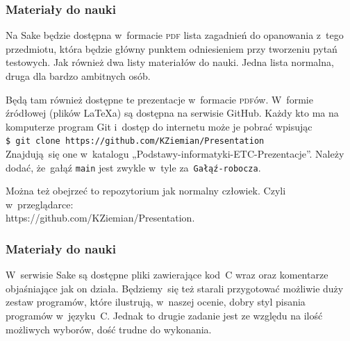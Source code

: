 \documentclass[10pt,t]{beamer}
\begin{document}
\begin{frame}
  \frametitle{Materiały do nauki}


  Na Sake będzie dostępna w~formacie \textsc{pdf} \alert{lista zagadnień do
    opanowania z~tego przedmiotu}, która będzie główny punktem odniesieniem
  przy tworzeniu pytań testowych. Jak również dwa listy materiałów do nauki.
  Jedna lista normalna, druga dla bardzo ambitnych osób.

  Będą tam również dostępne te prezentacje w~formacie \textsc{pdf}ów.
  W~formie źródłowej (plików \LaTeX a) są dostępna na serwisie GitHub.
  Każdy kto ma na komputerze program Git i~dostęp do internetu może je
  pobrać wpisując \\
  \texttt{\$ git clone https://github.com/KZiemian/Presentation} \\
  Znajdują~się one w~katalogu „Podstawy-informatyki-ETC-Prezentacje”.
  Należy dodać, że~gałąź \texttt{main} jest zwykle w~tyle
  za~\texttt{Gałąź-robocza}.

  Można też obejrzeć to repozytorium jak normalny człowiek. Czyli
  w~przeglądarce: \\
  {https://github.com/KZiemian/Presentation}.

\end{frame}





\begin{frame}
  \frametitle{Materiały do nauki}


  W~serwisie Sake są dostępne pliki zawierające kod~C wraz oraz komentarze
  objaśniające jak on działa. Będziemy~się też starali przygotować możliwie
  duży zestaw programów, które ilustrują, w~naszej ocenie, dobry styl
  pisania programów w~języku~C. Jednak to drugie zadanie jest ze względu
  na ilość możliwych wyborów, dość trudne do wykonania.

\end{frame}
\end{document}
